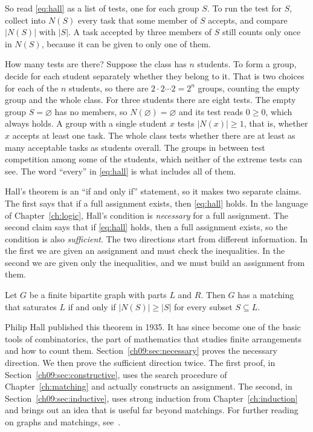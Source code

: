 So read \eqref{eq:hall} as a list of tests, one for each group $S$. To run the test for $S$, collect into $N(S)$ every task that some member of $S$ accepts, and compare $|N(S)|$ with $|S|$. A task accepted by three members of $S$ still counts only once in $N(S)$, because it can be given to only one of them.

How many tests are there? Suppose the class has $n$ students. To form a group, decide for each student separately whether they belong to it. That is two choices for each of the $n$ students, so there are $2\cdot2\cdots2=2^n$ groups, counting the empty group and the whole class. For three students there are eight tests. The empty group $S=\varnothing$ has no members, so $N(\varnothing)=\varnothing$ and its test reads $0\ge0$, which always holds. A group with a single student $x$ tests $|N(x)|\ge1$, that is, whether $x$ accepts at least one task. The whole class tests whether there are at least as many acceptable tasks as students overall. The groups in between test competition among some of the students, which neither of the extreme tests can see. The word ``every'' in \eqref{eq:hall} is what includes all of them.

Hall's theorem is an ``if and only if'' statement, so it makes two separate claims. The first says that if a full assignment exists, then \eqref{eq:hall} holds. In the language of Chapter~\ref{ch:logic}, Hall's condition is \emph{necessary} for a full assignment. The second claim says that if \eqref{eq:hall} holds, then a full assignment exists, so the condition is also \emph{sufficient}. The two directions start from different information. In the first we are given an assignment and must check the inequalities. In the second we are given only the inequalities, and we must build an assignment from them.

\par\noindent\begin{minipage}{\linewidth}
\begin{theorem}\label{thm:hall}
Let $G$ be a finite bipartite graph with parts $L$ and $R$. Then $G$ has a matching that saturates $L$ if and only if $|N(S)|\ge|S|$ for every subset $S\subseteq L$.
\end{theorem}
\end{minipage}\par

Philip Hall published this theorem in 1935. It has since become one of the basic tools of combinatorics, the part of mathematics that studies finite arrangements and how to count them. Section~\ref{ch09:sec:necessary} proves the necessary direction. We then prove the sufficient direction twice. The first proof, in Section~\ref{ch09:sec:constructive}, uses the search procedure of Chapter~\ref{ch:matching} and actually constructs an assignment. The second, in Section~\ref{ch09:sec:inductive}, uses strong induction from Chapter~\ref{ch:induction} and brings out an idea that is useful far beyond matchings. For further reading on graphs and matchings, see~\cite{mcs}.
